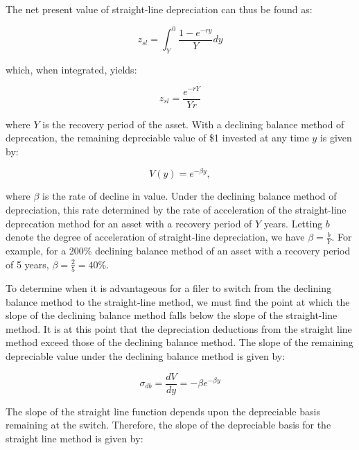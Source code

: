 \documentclass[article,11pt,letterpaper,fleqn]{article}
\theoremstyle{definition}
\numberwithin{equation}{section}
\begin{document}
The net present value of straight-line depreciation can thus be found as: 

\begin{equation}
z_{sl}=\int_{Y}^{0}\frac{1-e^{-ry}}{Y}dy
\end{equation}

\noindent\noindent which, when integrated, yields:

\begin{equation}
z_{sl}=\frac{e^{-rY}}{Yr}
\end{equation}

\noindent\noindent where $Y$ is the recovery period of the asset.  With a declining balance method of deprecation, the remaining depreciable value of \$1 invested at any time $y$ is given by:

\begin{equation}
V(y) =  e^{-\beta y}, 
\end{equation}

\noindent\noindent where $\beta$ is the rate of decline in value.  Under the declining balance method of depreciation, this rate determined by the rate of acceleration of the straight-line deprecation method for an asset with a recovery period of $Y$ years.  Letting $b$ denote the degree of acceleration of straight-line depreciation, we have $\beta=\frac{b}{Y}$.  For example, for a 200\% declining balance method of an asset with a recovery period of 5 years, $\beta =\frac{2}{5}=40\%$.

To determine when it is advantageous for a filer to switch from the declining balance method to the straight-line method, we must find the point at which the slope of the declining balance method falls below the slope of the straight-line method.  It is at this point that the depreciation deductions from the straight line method exceed those of the declining balance method.  The slope of the remaining depreciable value under the declining balance method is given by:


\begin{equation}
\sigma_{db} = \frac{dV}{dy}=-\beta e^{-\beta y}
\end{equation}

\noindent\noindent The slope of the straight line function depends upon the depreciable basis remaining at the switch.  Therefore, the slope of the depreciable basis for the straight line method is given by:
\end{document}
